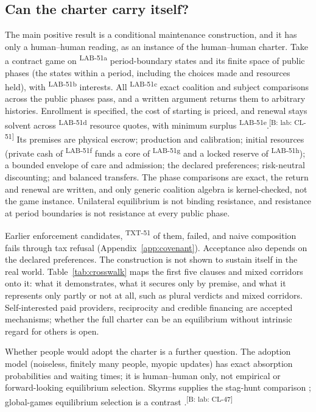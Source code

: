 \documentclass[pdflatex,sn-basic]{sn-jnl}%
\newcommand{\slot}[1]{}%
\newcommand{\claim}[2]{\ifannotated\textsuperscript{\textcolor{blue!60!black}{\tiny[#1: #2]}}\fi}
\newcommand{\rec}[1]{\ifannotated\textsuperscript{\textcolor{blue!60!black}{\tiny#1}}\fi}
\begin{document}
\subsection{Can the charter carry itself?}\label{sec:covenant-maintenance}

\slot{8.4}
The main positive result is a conditional maintenance construction, and it has only a human--human reading, as an instance of the human--human charter. Take a contract game on \numDNineteenStates\rec{LAB-51a} period-boundary states and its finite space of public phases (the states within a period, including the choices made and resources held), with \numDNineteenInterests\rec{LAB-51b} interests. All \numDNineteenPhaseComparisons\rec{LAB-51c} exact coalition and subject comparisons across the public phases pass, and a written argument returns them to arbitrary histories. Enrollment is specified, the cost of starting is priced, and renewal stays solvent across \numDNineteenQuotes\rec{LAB-51d} resource quotes, with minimum surplus \numDNineteenMinSurplus\rec{LAB-51e}.\claim{B: lab}{CL-51} Its premises are physical escrow; production and calibration; initial resources (private cash of \numDTwentyCash\rec{LAB-51f} funds a core of \numDTwentyCore\rec{LAB-51g} and a locked reserve of \numDTwentyReserve\rec{LAB-51h}); a bounded envelope of care and admission; the declared preferences; risk-neutral discounting; and balanced transfers. The phase comparisons are exact, the return and renewal are written, and only generic coalition algebra is kernel-checked, not the game instance. Unilateral equilibrium is not binding resistance, and resistance at period boundaries is not resistance at every public phase.

Earlier enforcement candidates, \numDNineteenFailedPredecessors\rec{TXT-51} of them, failed, and naive composition fails through tax refusal (Appendix~\ref{app:covenant}). Acceptance also depends on the declared preferences. The construction is not shown to sustain itself in the real world. Table~\ref{tab:crosswalk} maps the first five clauses and mixed corridors onto it: what it demonstrates, what it secures only by premise, and what it represents only partly or not at all, such as plural verdicts and mixed corridors. Self-interested paid providers, reciprocity and credible financing are accepted mechanisms; whether the full charter can be an equilibrium without intrinsic regard for others is open.

Whether people would adopt the charter is a further question. The adoption model (noiseless, finitely many people, myopic updates) has exact absorption probabilities and waiting times; it is human--human only, not empirical or forward-looking equilibrium selection. Skyrms supplies the stag-hunt comparison \citep{skyrms2004}; global-games equilibrium selection is a contrast \citep{carlsson1993}.\claim{B: lab}{CL-47}
\end{document}
